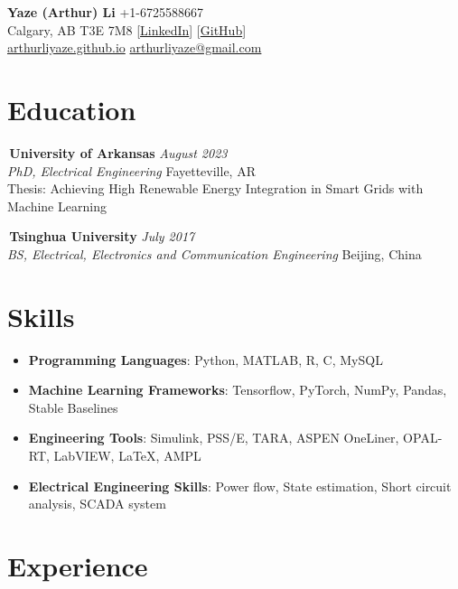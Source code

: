 \documentclass[11pt, letterpaper]{article}
\begin{document}
{\huge \textbf{Yaze (Arthur) Li}} \hfill +1-6725588667 \\
Calgary, AB T3E 7M8 \hfill
  [\href{https://www.linkedin.com/in/yaze-li-6b436a228}{LinkedIn}]
  [\href{https://github.com/Arthurliyaze}{GitHub}] \\
\href{https://arthurliyaze.github.io}{arthurliyaze.github.io} \hfill
  \href{mailto:arthurliyaze@gmail.com}{arthurliyaze@gmail.com}

\section{Education}

\textbullet\,\textbf{University of Arkansas} \hfill \textit{August 2023} \\
\textit{PhD, Electrical Engineering} \hfill Fayetteville, AR \\
Thesis: Achieving High Renewable Energy Integration in Smart Grids with Machine Learning

\textbullet\,\textbf{Tsinghua University} \hfill \textit{July 2017} \\
\textit{BS, Electrical, Electronics and Communication Engineering} \hfill Beijing, China

\section{Skills}

\begin{itemize}[label=\textbullet]
  \item \textbf{Programming Languages}: Python, MATLAB, R, C, MySQL
  \item \textbf{Machine Learning Frameworks}: Tensorflow, PyTorch, NumPy, Pandas, Stable Baselines
  \item \textbf{Engineering Tools}: Simulink, PSS/E, TARA, ASPEN OneLiner, OPAL-RT, LabVIEW, \LaTeX, AMPL
  \item \textbf{Electrical Engineering Skills}: Power flow, State estimation, Short circuit analysis, SCADA system
\end{itemize}

\section{Experience}
\end{document}
